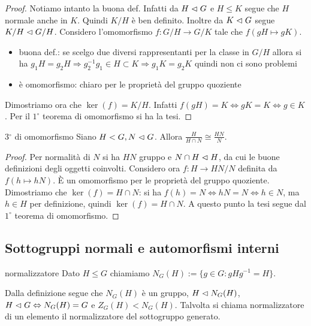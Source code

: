 \begin{proof}
    Notiamo intanto la buona def. Infatti da $H \vartriangleleft G$ e $H \leq K$ segue che $H$  normale anche in $K$. Quindi $K/H$ è ben definito. Inoltre da $K \vartriangleleft G$ segue $K/H \vartriangleleft G/H$.
    Considero l'omomorfismo $f: G/H \rightarrow G/K$ tale che $f(gH \mapsto gK)$.
    \begin{itemize}
    \item buona def.: se scelgo due diversi rappresentanti per la classe in $G/H$  allora si ha $g_1H = g_2H \Rightarrow g_2^{-1}g_1 \in H \subset K \Rightarrow g_1K = g_2K$ quindi non ci sono problemi
    \item è omomorfismo: chiaro per le proprietà del gruppo quoziente
    \end{itemize}
    Dimostriamo ora che $\ker(f) = K/H$. Infatti $f(gH) = K \iff gK = K \iff g \in K$. Per il $1^{\circ}$ teorema di omomorfismo si ha la tesi.
\end{proof}
\begin{theorem}{3$^{\circ}$ di omomorfismo} Siano $H < G, N \vartriangleleft G$. Allora $\frac{H}{H \cap N} \cong \frac{HN}{N}$.
\end{theorem}
\begin{proof}
    Per normalità di $N$ si ha $HN$ gruppo e $N \cap H \vartriangleleft H$, da cui le buone definizioni degli oggetti coinvolti. Considero ora $f: H \rightarrow HN/N$ definita da $f(h \mapsto hN)$. È un omomorfismo per le proprietà del gruppo quoziente. 
    Dimostriamo che $\ker(f) = H \cap N$: si ha $f(h) = N \iff hN = N \iff h \in N$, ma $h\in H$ per definizione, quindi $\ker(f) = H \cap N$. A questo punto la tesi segue dal $1^{\circ}$ teorema di omomorfismo.
\end{proof}

\subsection{Sottogruppi normali e automorfismi interni}
\begin{definition}{normalizzatore}
    Dato $H \leq G$ chiamiamo $N_G(H) := \{g \in G : gHg^{-1} = H\}$.
\end{definition}

Dalla definizione segue che $N_G(H)$ è un gruppo, $H \vartriangleleft N_G(H)$, $H \vartriangleleft G \Leftrightarrow N_G(H) = G$ e $Z_G(H) < N_G(H)$. Talvolta si chiama normalizzatore di un elemento il normalizzatore del sottogruppo generato.

